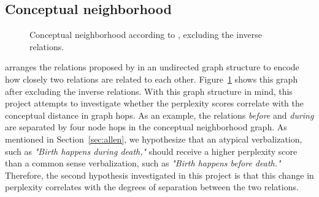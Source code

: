\documentclass[11pt]{article}
\begin{document}
\subsection{Conceptual neighborhood}

\begin{figure}
  \begin{center}
  \end{center}
  \caption{Conceptual neighborhood according to \citet{freksa}, excluding the inverse relations.}
  \label{fig:conceptual_neighborhood}
\end{figure}


\citet{freksa} arranges the relations proposed by \citet{allen} in an undirected graph structure to encode how closely two relations are related to each other. Figure~\ref{fig:conceptual_neighborhood} shows this graph after excluding the inverse relations. With this graph structure in mind, this project attempts to investigate whether the perplexity scores correlate with the conceptual distance in graph hops. As an example, the relations \textit{before} and \textit{during} are separated by four node hops in the conceptual neighborhood graph. As mentioned in Section~\ref{sec:allen}, we hypothesize that an atypical verbalization, such as \textit{"Birth happens during death,"} should receive a higher perplexity score than a common sense verbalization, such as \textit{"Birth happens before death."} Therefore, the second hypothesis investigated in this project is that this change in perplexity correlates with the degrees of separation between the two relations.
\end{document}
